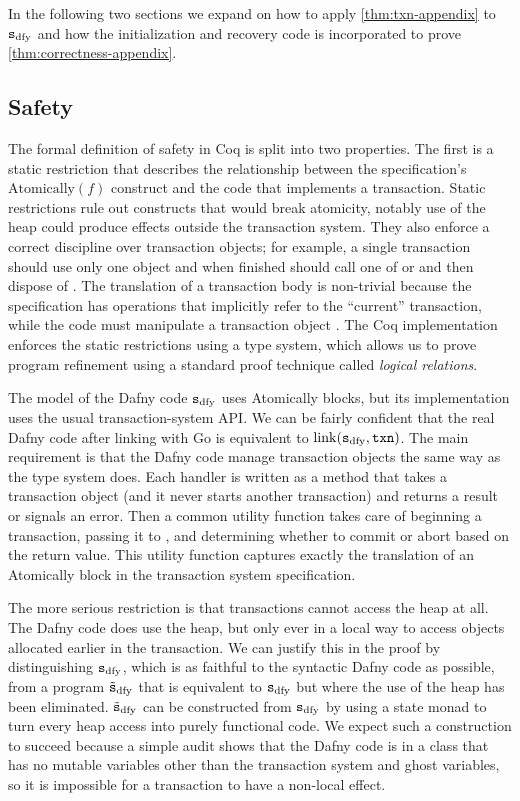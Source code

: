 In the following two sections we expand on how to apply \cref{thm:txn-appendix} to
$\texttt{s}_{\mathrm{dfy}}$ and how the initialization and recovery code is incorporated to prove
\cref{thm:correctness-appendix}.

\subsection{Safety}

The formal definition of safety in Coq is split into two properties. The first
is a static restriction that describes the
relationship between the specification's $\mathrm{Atomically}(f)$ construct and
the code that implements a transaction. Static restrictions rule out constructs
that would break atomicity, notably use of the heap could produce effects
outside the transaction system. They also enforce a correct discipline over
transaction objects; for example, a single transaction should use only one
 object and when finished should call one of  or 
and then dispose of . The translation of a transaction body is
non-trivial because the specification has operations that implicitly refer to
the ``current'' transaction, while the code must manipulate a transaction object
. The Coq implementation enforces the static restrictions using a type
system, which allows us to prove program refinement
using a standard proof technique called \emph{logical relations}.

The model of the Dafny code $\texttt{s}_{\mathrm{dfy}}$ uses Atomically blocks, but its
implementation uses the usual transaction-system API\@. We can be fairly confident
that the real Dafny code after linking with Go is equivalent to $\mathrm{link}(\texttt{s}_{\mathrm{dfy}}, \texttt{txn})$.
The main requirement is that the Dafny code manage transaction objects the same
way as the type system does. Each handler is written as a method that takes a
transaction object (and it never starts another transaction) and returns a
result or signals an error. Then a common utility function  takes
care of beginning a transaction, passing it to , and determining whether
to commit or abort based on the return value. This utility function captures
exactly the translation of an Atomically block in the transaction system specification.

The more serious restriction is that transactions cannot access the heap at all.
The Dafny code does use the heap, but only ever in a local way to access objects
allocated earlier in the transaction. We can justify this in the proof by
distinguishing $\texttt{s}_{\mathrm{dfy}}$, which is as faithful to the syntactic Dafny code as
possible, from a program $\tilde{\texttt{s}}_{\mathrm{dfy}}$ that is equivalent to $\texttt{s}_{\mathrm{dfy}}$ but where the
use of the heap has been eliminated. $\tilde{\texttt{s}}_{\mathrm{dfy}}$ can be constructed from $\texttt{s}_{\mathrm{dfy}}$
by using a state monad to turn every heap access into purely functional code.
We expect such a construction to succeed because
a simple audit shows that the Dafny code is in a class that has no mutable
variables other than the transaction system and ghost variables,
so it is impossible for a transaction to have a non-local effect.

